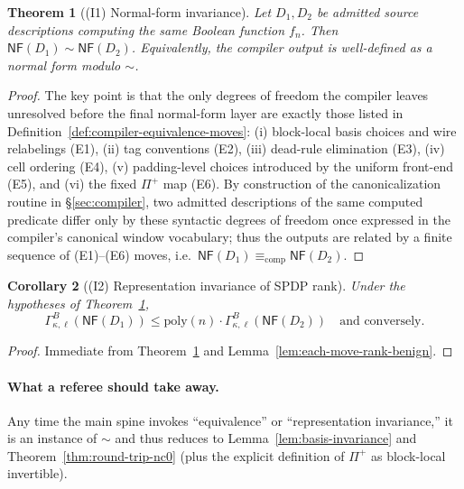 \documentclass[12pt]{article}
\newtheorem{theorem}{Theorem}
\newtheorem{corollary}[theorem]{Corollary}
\theoremstyle{definition}
\theoremstyle{definition}
\theoremstyle{remark}
\theoremstyle{remark}
\begin{document}
\begin{theorem}[(I1) Normal-form invariance]
\label{thm:I1-normal-form-invariance}
Let $D_1,D_2$ be admitted source descriptions computing the same Boolean function $f_n$.
Then $\mathsf{NF}(D_1)\sim \mathsf{NF}(D_2)$.
Equivalently, the compiler output is well-defined as a normal form \emph{modulo} $\sim$.
\end{theorem}

\begin{proof}
The key point is that the only degrees of freedom the compiler leaves unresolved before the
final normal-form layer are exactly those listed in
Definition~\ref{def:compiler-equivalence-moves}:
(i) block-local basis choices and wire relabelings (E1),
(ii) tag conventions (E2),
(iii) dead-rule elimination (E3),
(iv) cell ordering (E4),
(v) padding-level choices introduced by the uniform front-end (E5),
and (vi) the fixed $\Pi^+$ map (E6).
By construction of the canonicalization routine in \S\ref{sec:compiler}, two admitted descriptions of the
same computed predicate differ only by these syntactic degrees of freedom once expressed
in the compiler's canonical window vocabulary; thus the outputs are related by a finite
sequence of (E1)--(E6) moves, i.e.\ $\mathsf{NF}(D_1) \equiv_{\mathrm{comp}} \mathsf{NF}(D_2)$.
\end{proof}

\begin{corollary}[(I2) Representation invariance of SPDP rank]
\label{cor:I2-representation-invariance}
Under the hypotheses of Theorem~\ref{thm:I1-normal-form-invariance},
\[
\Gamma^{B}_{\kappa,\ell}(\mathsf{NF}(D_1)) \le \mathrm{poly}(n)\cdot \Gamma^{B}_{\kappa,\ell}(\mathsf{NF}(D_2))
\quad\text{and conversely.}
\]
\end{corollary}

\begin{proof}
Immediate from Theorem~\ref{thm:I1-normal-form-invariance} and
Lemma~\ref{lem:each-move-rank-benign}.
\end{proof}

\paragraph{What a referee should take away.}
Any time the main spine invokes ``equivalence'' or ``representation invariance,'' it is an
instance of $\sim$ and thus reduces to Lemma~\ref{lem:basis-invariance} and Theorem~\ref{thm:round-trip-nc0} (plus the explicit
definition of $\Pi^+$ as block-local invertible).
\end{document}
